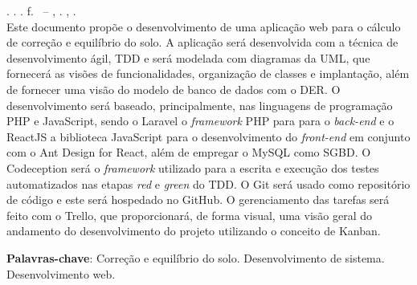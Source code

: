 
\begin{resumo}[RESUMO]
\begin{SingleSpacing}

\imprimirautorcitacao. \imprimirtitulo. \imprimirdata. \pageref {LastPage} f. \imprimirprojeto\ – \imprimirprograma, \imprimirinstituicao. \imprimirlocal, \imprimirdata.\\


Este documento propõe o desenvolvimento de uma aplicação web para o cálculo de correção e equilíbrio do solo. A aplicação será desenvolvida com a técnica de desenvolvimento ágil, TDD e será modelada com diagramas da UML, que fornecerá as visões de funcionalidades, organização de classes e implantação, além de fornecer uma visão do modelo de banco de dados com o DER. O desenvolvimento será baseado, principalmente, nas linguagens de programação PHP e JavaScript, sendo o Laravel o \textit{framework} PHP para para o \textit{back-end} e o ReactJS a biblioteca JavaScript para o desenvolvimento do \textit{front-end} em conjunto com o Ant Design for React, além de empregar o MySQL como SGBD. O Codeception será o \textit{framework} utilizado para a escrita e execução dos testes automatizados nas etapas \textit{red} e \textit{green} do TDD. O Git será usado como repositório de código e este será hospedado no GitHub. O gerenciamento das tarefas será feito com o Trello, que proporcionará, de forma visual, uma visão geral do andamento do desenvolvimento do projeto utilizando o conceito de Kanban.

\textbf{Palavras-chave}: Correção e equilíbrio do solo. Desenvolvimento de sistema. Desenvolvimento web.

\end{SingleSpacing}
\end{resumo}

